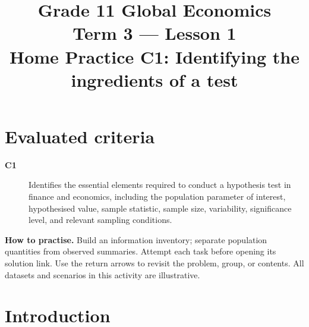 \makeatletter
{}
\makeatother


\newcommand{\Pop}[1]{\HighlightStroke{GTenHLParameter}{#1}}
\newcommand{\Obs}[1]{\HighlightStroke{GTenHLValue}{#1}}
\newcommand{\Design}[1]{\HighlightStroke{GTenHLThird}{#1}}
\newcommand{\Result}[1]{\HighlightStroke{GTenHLOutcome}{#1}}

\title{Grade 11 Global Economics\\Term 3 --- Lesson 1\\Home Practice C1: Identifying the ingredients of a test}
\author{}\date{}

\maketitle
\setcounter{tocdepth}{1}
\setcounter{secnumdepth}{2}
\label{toc}
\tableofcontents
\section*{Evaluated criteria}
\begin{description}
\item[\textbf{C1}] Identifies the essential elements required to conduct a hypothesis test in finance and economics, including the population parameter of interest, hypothesised value, sample statistic, sample size, variability, significance level, and relevant sampling conditions.
\end{description}
\textbf{How to practise.} Build an information inventory; separate population quantities from observed summaries. Attempt each task before opening its solution link. Use the return arrows to revisit the problem, group, or contents. All datasets and scenarios in this activity are illustrative.
\clearpage
\section{Introduction}\label{sec:introduction}
